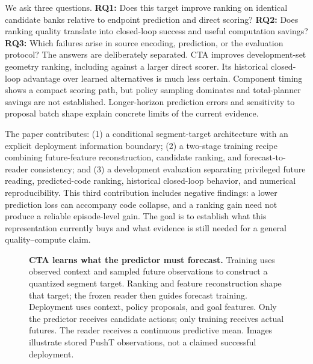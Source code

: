 We ask three questions. \textbf{RQ1:} Does this target improve ranking on identical candidate banks relative to endpoint prediction and direct scoring? \textbf{RQ2:} Does ranking quality translate into closed-loop success and useful computation savings? \textbf{RQ3:} Which failures arise in source encoding, prediction, or the evaluation protocol? The answers are deliberately separated. CTA improves development-set geometry ranking, including against a larger direct scorer. Its historical closed-loop advantage over learned alternatives is much less certain. Component timing shows a compact scoring path, but policy sampling dominates and total-planner savings are not established. Longer-horizon prediction errors and sensitivity to proposal batch shape explain concrete limits of the current evidence.

The paper contributes: (1) a conditional segment-target architecture with an explicit deployment information boundary; (2) a two-stage training recipe combining future-feature reconstruction, candidate ranking, and forecast-to-reader consistency; and (3) a development evaluation separating privileged future reading, predicted-code ranking, historical closed-loop behavior, and numerical reproducibility. This third contribution includes negative findings: a lower prediction loss can accompany code collapse, and a ranking gain need not produce a reliable episode-level gain. The goal is to establish what this representation currently buys and what evidence is still needed for a general quality--compute claim.

\begin{figure}[t]
\centering

\caption{\textbf{CTA learns what the predictor must forecast.} Training uses observed context and sampled future observations to construct a quantized segment target. Ranking and feature reconstruction shape that target; the frozen reader then guides forecast training. Deployment uses context, policy proposals, and goal features. Only the predictor receives candidate actions; only training receives actual futures. The reader receives a continuous predictive mean. Images illustrate stored PushT observations, not a claimed successful deployment.}
\label{fig:overview}
\end{figure}
